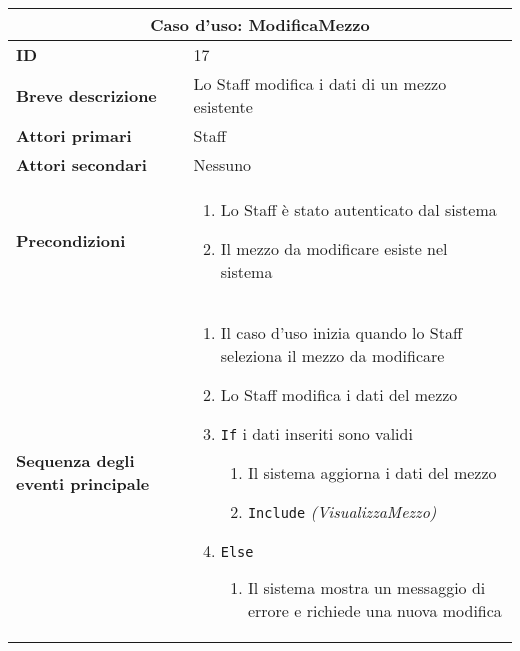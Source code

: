 \documentclass[a4paper]{report}
\begin{document}
\clearpage
\begin{table}[H]
\vspace*{-0cm}
\renewcommand{\arraystretch}{1.9}
\begin{tabular}{|p{3.9cm}|p{9.9cm}|}
\hline
\multicolumn{2}{|c|}{\textbf{Caso d’uso: ModificaMezzo}} \\ \hline
	\textbf{ID} & 17 \\ \hline
	\textbf{Breve descrizione} & Lo Staff modifica i dati di un mezzo esistente \\ \hline
	\textbf{Attori primari} & Staff \\ \hline
	\textbf{Attori secondari} & Nessuno \\ \hline
	\textbf{Precondizioni} & \begin{enumerate}[label=\arabic*.,leftmargin=14pt,labelsep=0.5em,topsep=0pt,partopsep=0pt,parsep=0pt,itemsep=0pt]
        \item Lo Staff è stato autenticato dal sistema
        \item Il mezzo da modificare esiste nel sistema
    \end{enumerate} \\ \hline
	\textbf{Sequenza degli eventi principale} & 
\begin{enumerate}[leftmargin=14pt,label=\arabic*.,labelsep=0.5em,topsep=0pt,partopsep=0pt,parsep=0pt,itemsep=0pt]
    \item Il caso d'uso inizia quando lo Staff seleziona il mezzo da modificare
    \item Lo Staff modifica i dati del mezzo
    \item \texttt{If} i dati inseriti sono validi
    \begin{enumerate}[label=\arabic{enumi}.\arabic*.,leftmargin=22pt,labelsep=0.5em,topsep=0pt,partopsep=0pt,parsep=0pt,itemsep=0pt]
        \item Il sistema aggiorna i dati del mezzo
        \item \texttt{Include} \textit{(VisualizzaMezzo)}
    \end{enumerate}
    \item \texttt{Else}
    \begin{enumerate}[label=\arabic{enumi}.\arabic*.,leftmargin=22pt,labelsep=0.5em,topsep=0pt,partopsep=0pt,parsep=0pt,itemsep=0pt]
        \item Il sistema mostra un messaggio di errore e richiede una nuova modifica
    \end{enumerate}
\end{enumerate}\\ \hline

\end{tabular}
\end{table}
\end{document}
